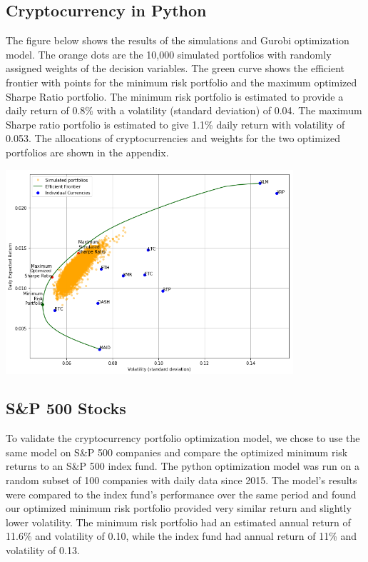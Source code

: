 \documentclass[11pt]{article} %
\begin{document}
\subsection{Cryptocurrency in Python}

The figure below shows the results of the simulations and Gurobi optimization model. The orange dots are the 10,000 simulated portfolios with randomly assigned weights of the decision variables. The green curve shows the efficient frontier with points for the minimum risk portfolio and the maximum optimized Sharpe Ratio portfolio. The minimum risk portfolio is estimated to provide a daily return of 0.8\% with a volatility (standard deviation) of 0.04. The maximum Sharpe ratio portfolio is estimated to give 1.1\% daily return with volatility of 0.053. The allocations of cryptocurrencies and weights for the two optimized portfolios are shown in the appendix.

\includegraphics[width=0.8\textwidth]{crypt1}

\subsection{S\&P 500 Stocks}

To validate the cryptocurrency portfolio optimization model, we chose to use the same model on S\&P 500 companies and compare the optimized minimum risk returns to an S\&P 500 index fund. The python optimization model was run on a random subset of 100 companies with daily data since 2015. The model’s results were compared to the index fund's performance over the same period and found our optimized minimum risk portfolio provided very similar return and slightly lower volatility. The minimum risk portfolio had an estimated annual return of 11.6\% and volatility of 0.10, while the index fund had annual return of 11\% and volatility of 0.13. 
\end{document}
